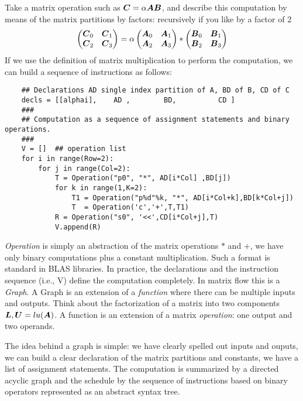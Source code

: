 \documentclass[acmsmall]{acmart}
\begin{document}
Take a matrix operation such as ${\boldsymbol C} = \alpha {\boldsymbol A}{\boldsymbol B}$, and
describe this computation by means of the matrix partitions by
factors: recursively if you like by a factor of 2
\begin{equation}
  \label{basic_2}
  \begin{pmatrix}
    {\boldsymbol C}_0 & {\boldsymbol C}_1 \\
    {\boldsymbol C}_2 & {\boldsymbol C}_3 \\
  \end{pmatrix} = \alpha
  \begin{pmatrix}
    {\boldsymbol A}_0 & {\boldsymbol A}_1 \\
    {\boldsymbol A}_2 & {\boldsymbol A}_3 \\
  \end{pmatrix} *
  \begin{pmatrix}
    {\boldsymbol B}_0 & {\boldsymbol B}_1 \\
    {\boldsymbol B}_2 & {\boldsymbol B}_3 \\
  \end{pmatrix} 
\end{equation}
If we use the definition of matrix multiplication to perform the
computation, we can build a sequence of instructions as follows:
{\small \begin{verbatim}
    ## Declarations AD single index partition of A, BD of B, CD of C 
    decls = [[alphai],    AD ,        BD,          CD ]     
    ###
    ## Computation as a sequence of assignment statements and binary operations.  
    ###
    V = []  ## operation list  
    for i in range(Row=2):
        for j in range(Col=2):
            T = Operation("p0", "*", AD[i*Col] ,BD[j])
            for k in range(1,K=2):
                T1 = Operation("p%d"%k, "*", AD[i*Col+k],BD[k*Col+j])
                T  = Operation('c','+',T,T1)
            R = Operation("s0", '<<',CD[i*Col+j],T)
            V.append(R)
\end{verbatim}}
{\em Operation} is simply an abstraction of the matrix operations $*$
and $+$, we have only binary computations plus a constant
multiplication. Such a format is standard in BLAS libraries. In
practice, the declarations and the instruction sequence (i.e., V)
define the computation completely. In matrix flow this is a {\em
  Graph}. A Graph is an extension of a {\em function} where there can
be multiple inputs and outputs.  Think about the factorization of a
matrix into two components ${\boldsymbol L},{\boldsymbol U} = lu({\boldsymbol A})$. A function is
an extension of a matrix {\em operation}: one output and two operands.

The idea behind a graph is simple: we have clearly spelled out inputs
and ouputs, we can build a clear declaration of the matrix partitions
and constants, we have a list of assignment statements.  The
computation is summarized by a directed acyclic graph and the schedule
by the sequence of instructions based on binary operators represented
as an abstract syntax tree.
\end{document}
